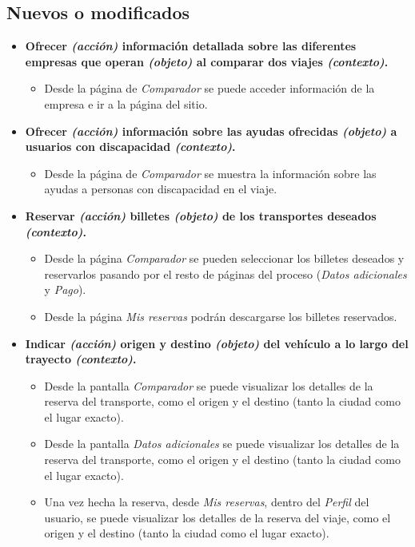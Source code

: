 \subsection*{Nuevos o modificados}

\begin{itemize}
    \item \textbf{Ofrecer \textit{(acción)} información detallada sobre las diferentes empresas que operan
        \textit{(objeto)} al comparar dos viajes \textit{(contexto)}.}
        \begin{itemize}
            \item Desde la página de \textit{Comparador} se puede acceder información de la empresa e
                ir a la página del sitio.
        \end{itemize}
    
    \item \textbf{Ofrecer \textit{(acción)} información sobre las ayudas ofrecidas \textit{(objeto)} a usuarios 
        con discapacidad \textit{(contexto)}.}
        \begin{itemize}
            \item Desde la página de \textit{Comparador} se muestra la información sobre las ayudas a personas
                con discapacidad en el viaje.
        \end{itemize}
    
    \item \textbf{Reservar \textit{(acción)} billetes \textit{(objeto)} de los transportes deseados \textit{(contexto)}.} 
        \begin{itemize}
            \item Desde la página \textit{Comparador} se pueden seleccionar los billetes deseados y reservarlos pasando por el 
                resto de páginas del proceso (\textit{Datos adicionales} y \textit{Pago}).
            \item Desde la página \textit{Mis reservas} podrán descargarse los billetes reservados.
        \end{itemize}

    \item \textbf{Indicar \textit{(acción)} origen y destino \textit{(objeto)} del vehículo a lo largo del trayecto
        \textit{(contexto)}.}
        \begin{itemize}
            \item Desde la pantalla \textit{Comparador} se puede visualizar los detalles de la reserva del transporte, como el origen y el destino (tanto
                la ciudad como el lugar exacto).
            \item Desde la pantalla \textit{Datos adicionales} se puede visualizar los detalles de la reserva del transporte, como el origen y el destino (tanto
                la ciudad como el lugar exacto).
            \item Una vez hecha la reserva, desde \textit{Mis reservas}, dentro del \textit{Perfil} del usuario, se puede visualizar los detalles de la reserva del viaje, como el origen y el destino (tanto
                la ciudad como el lugar exacto).
        \end{itemize}


\end{itemize}

